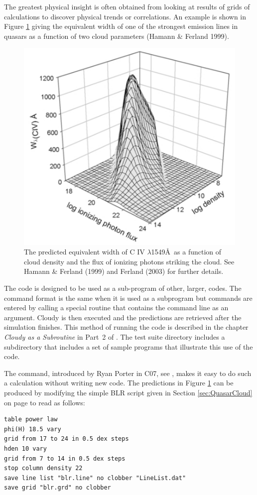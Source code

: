 \documentclass[12pt,twoside]{article}
\begin{document}
{The greatest physical insight is often obtained from looking at results
of grids of calculations to discover physical trends or correlations.  An
example is shown in Figure \ref{fig:CIV_equivalent_width}
giving the equivalent width of one of the
strongest emission lines in quasars as a function of two cloud parameters
(Hamann \& Ferland 1999).

\begin{figure}
\begin{center}
\includegraphics[clip=on,width=0.8\columnwidth,height=0.8\textheight,keepaspectratio]{CIV_equivalent_width}
\end{center}
\caption{The predicted equivalent width of
C IV $\lambda$1549\AA\ as a function of cloud density
and the flux of ionizing photons striking the cloud.  See Hamann \& Ferland
(1999) and Ferland (2003) for further details.}
\label{fig:CIV_equivalent_width}
\end{figure}

The code is designed to be used as a sub-program of other, larger, codes.
The command format is the same when it is used as a subprogram but commands
are entered by calling a special routine that contains the command line
as an argument.  Cloudy is then executed and the predictions are retrieved
after the simulation finishes.  This method of running the code is described
in the chapter \emph{Cloudy as a Subroutine} in Part~2 of \Hazy.
The test suite
directory includes a subdirectory 
that includes a set of sample
programs that illustrate this use of the code.

The  command, introduced by
Ryan Porter in C07, see \citet{PorterEtAl06},
makes it easy to do such a calculation without writing new code.  The
predictions in Figure \ref{fig:CIV_equivalent_width}
can be produced by modifying the simple BLR script
given in Section \ref{sec:QuasarCloud} on page
\pageref{sec:QuasarCloud} to read as follows:
\small
\begin{verbatim}
table power law
phi(H) 18.5 vary
grid from 17 to 24 in 0.5 dex steps
hden 10 vary
grid from 7 to 14 in 0.5 dex steps
stop column density 22
save line list "blr.line" no clobber "LineList.dat"
save grid "blr.grd" no clobber
\end{verbatim}
\normalsize

}
\end{document}
